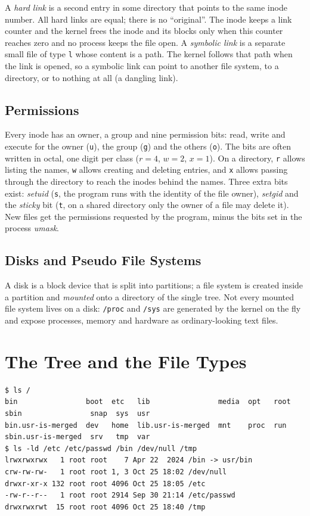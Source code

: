 \documentclass[12pt,a4paper]{article}
\begin{document}
A \textit{hard link} is a second entry in some directory that points to the same inode number. All hard links are equal; there is no ``original''. The inode keeps a link counter and the kernel frees the inode and its blocks only when this counter reaches zero and no process keeps the file open. A \textit{symbolic link} is a separate small file of type \texttt{l} whose content is a path. The kernel follows that path when the link is opened, so a symbolic link can point to another file system, to a directory, or to nothing at all (a dangling link).

\subsection{Permissions}

Every inode has an owner, a group and nine permission bits: read, write and execute for the owner (\texttt{u}), the group (\texttt{g}) and the others (\texttt{o}). The bits are often written in octal, one digit per class ($r=4$, $w=2$, $x=1$). On a directory, \texttt{r} allows listing the names, \texttt{w} allows creating and deleting entries, and \texttt{x} allows passing through the directory to reach the inodes behind the names. Three extra bits exist: \textit{setuid} (\texttt{s}, the program runs with the identity of the file owner), \textit{setgid} and the \textit{sticky} bit (\texttt{t}, on a shared directory only the owner of a file may delete it). New files get the permissions requested by the program, minus the bits set in the process \textit{umask}.

\subsection{Disks and Pseudo File Systems}

A disk is a block device that is split into partitions; a file system is created inside a partition and \textit{mounted} onto a directory of the single tree. Not every mounted file system lives on a disk: \texttt{/proc} and \texttt{/sys} are generated by the kernel on the fly and expose processes, memory and hardware as ordinary-looking text files.

\newpage
\section{The Tree and the File Types}

\begin{lstlisting}[style=terminal,caption={The root directory and the types of some important paths}]
$ ls /
bin                boot  etc   lib                media  opt   root  sbin                snap  sys  usr
bin.usr-is-merged  dev   home  lib.usr-is-merged  mnt    proc  run   sbin.usr-is-merged  srv   tmp  var
$ ls -ld /etc /etc/passwd /bin /dev/null /tmp
lrwxrwxrwx   1 root root    7 Apr 22  2024 /bin -> usr/bin
crw-rw-rw-   1 root root 1, 3 Oct 25 18:02 /dev/null
drwxr-xr-x 132 root root 4096 Oct 25 18:05 /etc
-rw-r--r--   1 root root 2914 Sep 30 21:14 /etc/passwd
drwxrwxrwt  15 root root 4096 Oct 25 18:40 /tmp
\end{lstlisting}
\end{document}
